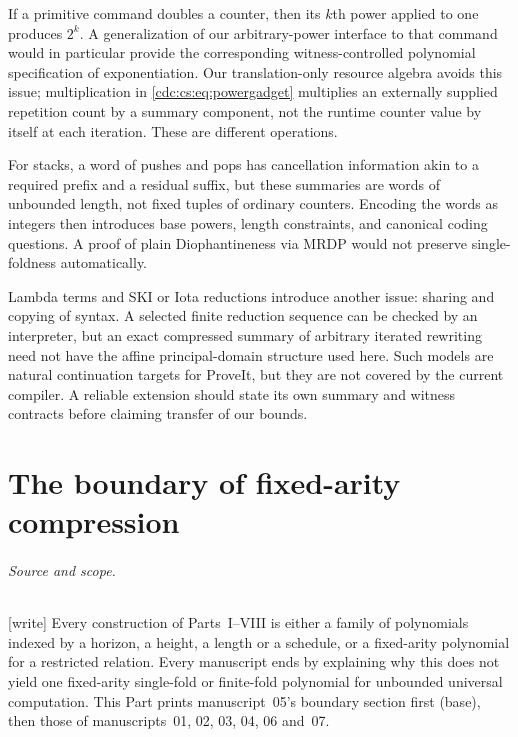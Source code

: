 \documentclass[11pt,a4paper]{article}
\theoremstyle{definition}
\theoremstyle{remark}
\newcommand{\wtag}{\textup{[write]}}%
\begin{document}
If a primitive command doubles a counter, then its $k$th power applied to
one produces $2^k$. A generalization of our arbitrary-power interface to that
command would in particular provide the corresponding witness-controlled
polynomial specification of exponentiation. Our translation-only resource
algebra avoids this issue; multiplication in \eqref{cdc:cs:eq:powergadget} multiplies
an externally supplied repetition count by a summary component, not the
runtime counter value by itself at each iteration. These are different
operations.

For stacks, a word of pushes and pops has cancellation information akin to
a required prefix and a residual suffix, but these summaries are words of
unbounded length, not fixed tuples of ordinary counters. Encoding the words
as integers then introduces base powers, length constraints, and canonical
coding questions. A proof of plain Diophantineness via MRDP would not preserve
single-foldness automatically.

Lambda terms and SKI or Iota reductions introduce another issue: sharing and
copying of syntax. A selected finite reduction sequence can be checked by an
interpreter, but an exact compressed summary of arbitrary iterated rewriting
need not have the affine principal-domain structure used here. Such models
are natural continuation targets for ProveIt, but they are not covered by the
current compiler. A reliable extension should state its own summary and
witness contracts before claiming transfer of our bounds.


\part{The boundary of fixed-arity compression}\label{cdc:part:boundary}

\paragraph{Source and scope.} \wtag{} Every construction of Parts~I--VIII is either a family of polynomials indexed by a horizon, a height, a length or a schedule, or a fixed-arity polynomial for a restricted relation. Every manuscript ends by explaining why this does not yield one fixed-arity single-fold or finite-fold polynomial for unbounded universal computation. This Part prints manuscript~05's boundary section first (base), then those of manuscripts~01, 02, 03, 04, 06 and~07.
\end{document}
